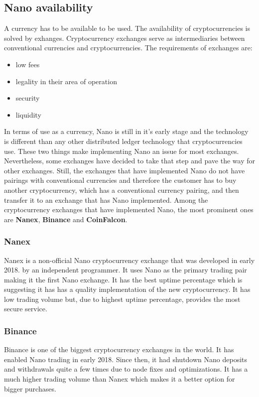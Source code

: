 \documentclass{ferseminar}
\begin{document}
\subsection{Nano availability}

A currency has to be available to be used. The availability of cryptocurrencies is solved by exhanges. Cryptocurrency exchanges serve as intermediaries between conventional currencies and cryptocurrencies. The requirements of exchanges are:
\begin{itemize}
	\item low fees
	\item legality in their area of operation
	\item security
	\item liquidity
\end{itemize}

In terms of use as a currency, Nano is still in it's early stage and the technology is different than any other distributed ledger technology that cryptocurrencies use. These two things make implementing Nano an issue for most exchanges. Nevertheless, some exchanges have decided to take that step and pave the way for other exchanges. Still, the exchanges that have implemented Nano do not have pairings with conventional currencies and therefore the customer has to buy another cryptocurrency, which has a conventional currency pairing, and then transfer it to an exchange that has Nano implemented. Among the cryptocurrency exchanges that have implemented Nano, the most prominent ones are \textbf{Nanex}, \textbf{Binance} and \textbf{CoinFalcon}.

\subsubsection{Nanex}
Nanex is a non-official Nano cryptocurrency exchange that was developed in early 2018. by an independent programmer. It uses Nano as the primary trading pair making it the first Nano exchange. It has the best uptime percentage which is suggesting it has has a quality implementation of the new cryptocurrency. It has low trading volume but, due to highest uptime percentage, provides the most secure service.

\subsubsection{Binance}
Binance is one of the biggest cryptocurrency exchanges in the world. It has enabled Nano trading in early 2018. Since then, it had shutdown Nano deposits and withdrawals quite a few times due to node fixes and optimizations. It has a much higher trading volume than Nanex which makes it a better option for bigger purchases.
\end{document}
